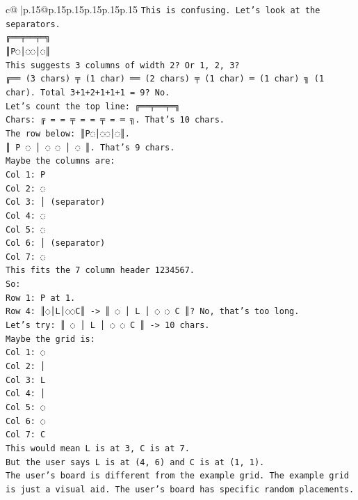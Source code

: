 \documentclass{article}
\begin{document}
{\begin{supertabular}{c@{$\;$}|p{.15\linewidth}@{}p{.15\linewidth}p{.15\linewidth}p{.15\linewidth}p{.15\linewidth}p{.15\linewidth}}
{{{\texttt{This is confusing. Let's look at the separators.} \\
\texttt{╔══╤══╤═╗} \\
\texttt{║P◌│◌◌│◌║} \\
\texttt{This suggests 3 columns of width 2? Or 1, 2, 3?} \\
\texttt{╔══ (3 chars) ╤ (1 char) ══ (2 chars) ╤ (1 char) ═ (1 char) ╗ (1 char). Total 3+1+2+1+1+1 = 9? No.} \\
\texttt{Let's count the top line: ╔══╤══╤═╗} \\
\texttt{Chars: ╔ = = ╤ = = ╤ = ═ ╗. That's 10 chars.} \\
\texttt{The row below: ║P◌│◌◌│◌║.} \\
\texttt{║ P ◌ │ ◌ ◌ │ ◌ ║. That's 9 chars.} \\
\texttt{Maybe the columns are:} \\
\texttt{Col 1: P} \\
\texttt{Col 2: ◌} \\
\texttt{Col 3: │ (separator)} \\
\texttt{Col 4: ◌} \\
\texttt{Col 5: ◌} \\
\texttt{Col 6: │ (separator)} \\
\texttt{Col 7: ◌} \\
\texttt{This fits the 7 column header 1234567.} \\
\texttt{So:} \\
\texttt{Row 1: P at 1.} \\
\texttt{Row 4: ║◌│L│◌◌C║ {-}> ║ ◌ │ L │ ◌ ◌ C ║? No, that's too long.} \\
\texttt{Let's try: ║ ◌ │ L │ ◌ ◌ C ║ {-}> 10 chars.} \\
\texttt{Maybe the grid is:} \\
\texttt{Col 1: ◌} \\
\texttt{Col 2: │} \\
\texttt{Col 3: L} \\
\texttt{Col 4: │} \\
\texttt{Col 5: ◌} \\
\texttt{Col 6: ◌} \\
\texttt{Col 7: C} \\
\texttt{This would mean L is at 3, C is at 7.} \\
\texttt{But the user says L is at (4, 6) and C is at (1, 1).} \\
\texttt{The user's board is different from the example grid. The example grid is just a visual aid. The user's board has specific random placements.} \\
}}}
\end{supertabular}}
\end{document}
